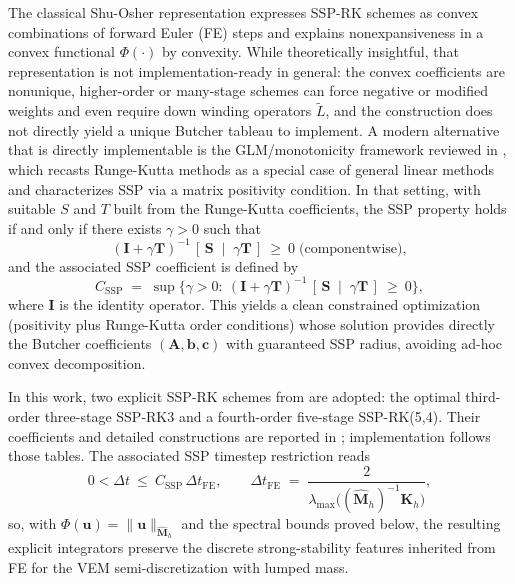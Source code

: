 \documentclass{article}
\renewcommand{\u}{\mathbf{u}}
\newcommand{\K}{\mathbf{K}_h}
\newcommand{\M}{\hat{\mathbf{M}}_h}
\begin{document}
The classical Shu-Osher representation expresses SSP-RK schemes as convex combinations of forward Euler (FE) steps and explains nonexpansiveness in a convex functional $\Phi(\cdot)$ by convexity. While theoretically insightful, that representation is not implementation-ready in general: the convex coefficients are nonunique, higher-order or many-stage schemes can force negative or modified weights and even require down winding operators $\tilde{L}$, and the construction does not directly yield a unique Butcher tableau to implement. A modern alternative that is directly implementable is the GLM/monotonicity framework reviewed in \cite{izzo2022ssp}, which recasts Runge-Kutta methods as a special case of general linear methods and characterizes SSP via a matrix positivity condition. In that setting, with suitable $S$ and $T$ built from the Runge-Kutta coefficients, the SSP property holds if and only if there exists $\gamma>0$ such that
\begin{equation}
    \nonumber
    (\mathbf{I}+\gamma \mathbf{T})^{-1}\,[\,\mathbf{S} \;\mid\; \gamma \mathbf{T}\,]\ \ge\ 0 \; \text{(componentwise)},
\end{equation}
and the associated SSP coefficient is defined by
\begin{equation}
    \nonumber
    C_{\mathrm{SSP}}\;=\;\sup\big\{\gamma>0:\ (\mathbf{I}+\gamma \mathbf{T})^{-1}\,[\,\mathbf{S} \;\mid\; \gamma \mathbf{T}\,]\ \ge\ 0\big\},
\end{equation}
where $\mathbf{I}$ is the identity operator. This yields a clean constrained optimization (positivity plus Runge-Kutta order conditions) whose solution provides directly the Butcher coefficients $(\mathbf{A},\mathbf{b},\mathbf{c})$ with guaranteed SSP radius, avoiding ad-hoc convex decomposition.

In this work, two explicit SSP-RK schemes from \cite{izzo2022ssp} are adopted: the optimal third-order three-stage SSP-RK3 and a fourth-order five-stage SSP-RK(5,4). Their coefficients and detailed constructions are reported in \cite{izzo2022ssp}; implementation follows those tables. The associated SSP timestep restriction reads
\begin{equation}
    \nonumber
    0<\Delta t\ \le\ C_{\mathrm{SSP}}\,\Delta t_{\mathrm{FE}},
    \qquad
    \Delta t_{\mathrm{FE}} \;=\; \frac{2}{\lambda_{\max}\!\big((\M)^{-1}\K\big)},
\end{equation}
so, with $\Phi(\u)=\|\u\|_{\M}$ and the spectral bounds proved below, the resulting explicit integrators preserve the discrete strong-stability features inherited from FE for the VEM semi-discretization with lumped mass.
\end{document}
